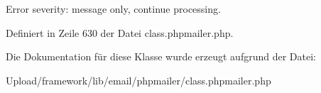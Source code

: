 Error severity\+: message only, continue processing. 

Definiert in Zeile 630 der Datei class.\+phpmailer.\+php.



Die Dokumentation für diese Klasse wurde erzeugt aufgrund der Datei\+:\begin{DoxyCompactItemize}
\item 
Upload/framework/lib/email/phpmailer/class.\+phpmailer.\+php\end{DoxyCompactItemize}
